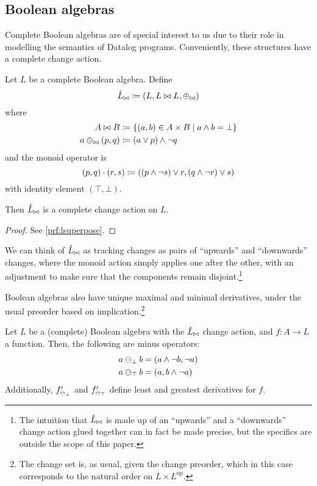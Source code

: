 \subsection{Boolean algebras}
\label{sec:booleanAlgebras}

Complete Boolean algebras are of special interest to us due to their role in modelling the semantics of
Datalog programs. Conveniently, these structures have a complete change action.

\begin{prop}[name=Boolean algebra change actions, restate=lsuperpose]
 Let $L$ be a complete Boolean algebra. Define
  \begin{displaymath}
    \hat{L}_{\bowtie} \coloneqq (L,L \bowtie L,\oplus_{\bowtie})
  \end{displaymath}
  where
  \begin{align*}
    A \bowtie B &\coloneqq \{ (a, b) \in A \times B \mid a \wedge b = \bot \}\\
    a \oplus_{\bowtie} (p, q) &\coloneqq (a \vee p) \wedge \neg q
  \end{align*}
  and the monoid operator is
  \begin{displaymath}
    (p, q) \cdot (r, s) \coloneqq ((p \wedge \neg s) \vee r, (q \wedge \neg r) \vee s)
  \end{displaymath}
  with identity element $(\top, \bot)$.

  Then $\hat{L}_{\bowtie}$ is a complete change action on $L$.
\end{prop}
\ifproofs
\begin{proof}
  See \cref{prf:lsuperpose}.
\end{proof}
\fi

We can think of $\hat{L}_{\bowtie}$ as tracking changes as pairs of ``upwards'' and
``downwards'' changes, where the monoid action simply applies one after the
other, with an adjustment to make sure that the components remain disjoint.\footnote{
  The intuition that $\hat{L}_{\bowtie}$ is made up of an ``upwards''
  and a ``downwards'' change action glued together can in fact be made precise, but the specifics
  are outside the scope of this paper.}

Boolean algebras also have unique maximal and minimal
derivatives, under the usual preorder based on implication.\footnote{The change
set is, as usual, given the change preorder, which in this case corresponds to
the natural order on $L \times L^{\textrm{op}}$.}

\begin{prop}
  \label{prop:minimalMaximalDerivatives}
  Let $L$ be a (complete) Boolean algebra with the $\hat{L}_{\bowtie}$ change action, and
  $f: A \rightarrow L$ a function.
  Then, the following are minus operators:
  \begin{align*}
    a \ominus_\bot b &= (a \wedge \neg b, \neg a)\\
    a \ominus_\top b &= (a, b \wedge \neg a)
  \end{align*}
  Additionally, $f'_{\ominus_{\bot}}$ and $f'_{\ominus_{\top}}$ 
  define least and greatest derivatives for $f$.
\end{prop}

